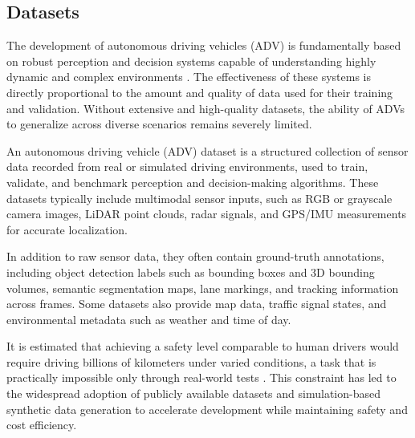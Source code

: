 



\subsection{Datasets}

The development of autonomous driving vehicles (ADV) is fundamentally based on robust perception and decision systems capable of understanding highly dynamic and complex environments \cite{feng2020}. The effectiveness of these systems is directly proportional to the amount and quality of data used for their training and validation. Without extensive and high-quality datasets, the ability of ADVs to generalize across diverse scenarios remains severely limited.

An autonomous driving vehicle (ADV) dataset is a structured collection of sensor data recorded from real or simulated driving environments, used to train, validate, and benchmark perception and decision-making algorithms. These datasets typically include multimodal sensor inputs, such as RGB or grayscale camera images, LiDAR point clouds, radar signals, and GPS/IMU measurements for accurate localization.

In addition to raw sensor data, they often contain ground-truth annotations, including object detection labels such as bounding boxes and 3D bounding volumes, semantic segmentation maps, lane markings, and tracking information across frames. Some datasets also provide map data, traffic signal states, and environmental metadata such as weather and time of day.

It is estimated that achieving a safety level comparable to human drivers would require driving billions of kilometers under varied conditions, a task that is practically impossible only through real-world tests \cite{angeletti2023}. This constraint has led to the widespread adoption of publicly available datasets and simulation-based synthetic data generation to accelerate development while maintaining safety and cost efficiency.

